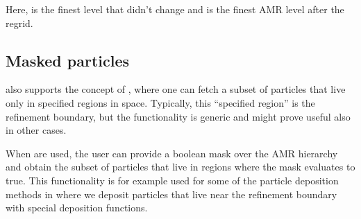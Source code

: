 \documentclass[letterpaper,10pt,english]{sphinxmanual}
\begin{document}
\begin{sphinxVerbatim}[commandchars=\\\{\},formatcom=\scriptsize]
 

    


 
 
 
 
 
 

     
\end{sphinxVerbatim}

Here,  is the finest level that didn’t change and  is the finest AMR level after the regrid.


\subsection{Masked particles}
\label{\detokenize{Source/Particles:masked-particles}}\label{\detokenize{Source/Particles:chap-maskedparticles}}
 also supports the concept of , where one can fetch a subset of particles that live only in specified regions in space.
Typically, this “specified region” is the refinement boundary, but the functionality is generic and might prove useful also in other cases.

When  are used, the user can provide a boolean mask over the AMR hierarchy and obtain the subset of particles that live in regions where the mask evaluates to true.
This functionality is for example used for some of the particle deposition methods in  where we deposit particles that live near the refinement boundary with special deposition functions.
\end{document}
